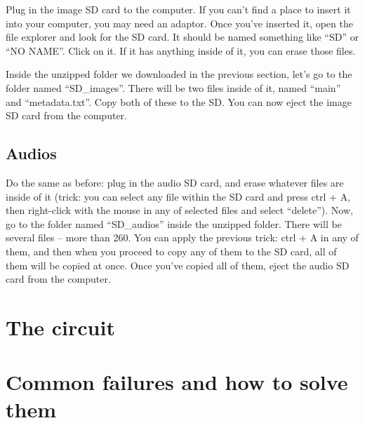\documentclass{article}
\begin{document}
Plug in the image SD card to the computer. If you can't find a place to insert it into your computer, you may need an adaptor. Once you've inserted it, open the file explorer and look for the SD card. It should be named something like ``SD'' or ``NO NAME''. Click on it. If it has anything inside of it, you can erase those files.


Inside the unzipped folder we downloaded in the previous section, let's go to the folder named ``SD\_images''. There will be two files inside of it, named ``main'' and ``metadata.txt''. Copy both of these to the SD. You can now eject the image SD card from the computer.

\subsection{Audios}
Do the same as before: plug in the audio SD card, and erase whatever files are inside of it (trick: you can select any file within the SD card and press ctrl + A, then right-click with the mouse in any of selected files and select ``delete''). Now, go to the folder named ``SD\_audios'' inside the unzipped folder. There will be several files -- more than 260. You can apply the previous trick: ctrl + A in any of them, and then when you proceed to copy any of them to the SD card, all of them will be copied at once. Once you've copied all of them, eject the audio SD card from the computer.

\newpage
\section{The circuit}\label{sec:circuit}

\newpage
\section{Common failures and how to solve them}\label{sec:failures}
\end{document}
